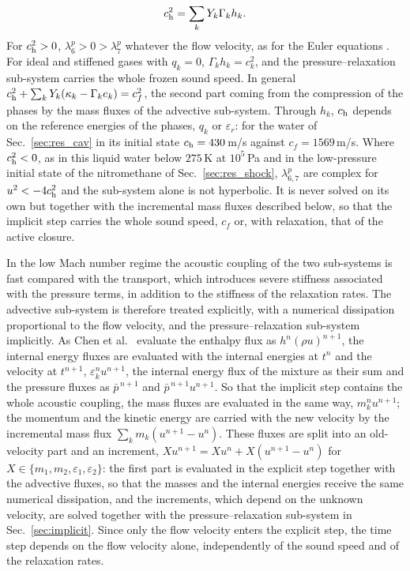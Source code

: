 \documentclass[a4paper,fleqn]{cas-sc}
\begin{document}
\begin{enumerate}
\begin{equation}
\begin{gathered}
c_{\rm h}^2=\sum_kY_k\Gamma_kh_k .
\end{gathered}
\label{eq:eig_p}
\end{equation}
For $c_{\rm h}^2>0$, $\lambda^p_6>0>\lambda^p_7$ whatever the flow velocity, as for the Euler equations \cite{ToroVazquez2012}. For ideal and
stiffened gases with $q_k=0$, $\Gamma_kh_k=c_k^2$, and the pressure--relaxation sub-system carries the whole frozen sound speed. In
general $c_{\rm h}^2+\sum_kY_k(\kappa_k-\Gamma_ke_k)=c_f^2$, the second part coming from the compression of the phases by the mass fluxes
of the advective sub-system. Through $h_k$, $c_{\rm h}$ depends on the reference energies of the phases, $q_k$ or $\varepsilon_r$: for the water of
Sec.~\ref{sec:res_cav} in its initial state $c_{\rm h}=430$\,m/s against $c_f=1569$\,m/s. Where $c_{\rm h}^2<0$, as in this liquid water below $275$\,K
at $10^5$\,Pa and in the low-pressure initial state of the nitromethane of Sec.~\ref{sec:res_shock}, $\lambda^p_{6,7}$ are complex for $u^2<-4c_{\rm h}^2$
and the sub-system alone is not hyperbolic. It is never solved on its own but together with the incremental mass fluxes
described below, so that the implicit step carries the whole sound speed, $c_f$ or, with relaxation, that of the active
closure.
\end{enumerate}
In the low Mach number regime the acoustic coupling of the two sub-systems is fast compared with the transport, which
introduces severe stiffness associated with the pressure terms, in addition to the stiffness of the relaxation rates.
The advective sub-system is therefore treated explicitly, with a numerical dissipation proportional to the flow velocity,
and the pressure--relaxation sub-system implicitly. As Chen et al.\ \cite{Chen2026} evaluate the enthalpy flux as $h^n(\rho u)^{n+1}$,
the internal energy fluxes are evaluated with the internal energies at $t^n$ and the velocity at $t^{n+1}$, $\varepsilon^n_ku^{n+1}$, the internal
energy flux of the mixture as their sum and the pressure fluxes as $\bar p^{\,n+1}$ and $\bar p^{\,n+1}u^{n+1}$. So that the implicit step contains the whole
acoustic coupling, the mass fluxes are evaluated in the same way, $m^n_ku^{n+1}$; the momentum and the kinetic energy are carried
with the new velocity by the incremental mass flux $\sum_km_k(u^{n+1}-u^n)$. These fluxes are split into an old-velocity part and an
increment, $Xu^{n+1}=Xu^n+X(u^{n+1}-u^n)$ for $X\in\{m_1,m_2,\varepsilon_1,\varepsilon_2\}$: the first part is evaluated in the explicit step together with the advective fluxes, so that the masses and the internal energies receive the same
numerical dissipation, and the increments, which depend on the unknown velocity, are solved together with the
pressure--relaxation sub-system in Sec.~\ref{sec:implicit}. Since only the flow velocity enters the explicit step, the time step depends
on the flow velocity alone, independently of the sound speed and of the relaxation rates.
\end{document}
